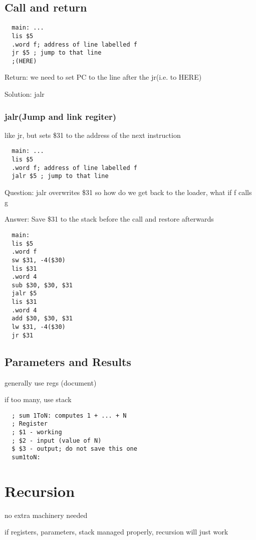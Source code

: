 \documentclass[11pt]{amsart}
\begin{document}
\subsection{Call and return}
\begin{verbatim}
  main: ...
  lis $5
  .word f; address of line labelled f
  jr $5 ; jump to that line
  ;(HERE)
\end{verbatim}
\par Return: we need to set PC to the line after the jr(i.e. to HERE)
\par Solution: jalr
\subsubsection{jalr(Jump and link regiter)}
\par like jr, but sets \$31 to the address of the next instruction
\begin{verbatim}
  main: ...
  lis $5
  .word f; address of line labelled f
  jalr $5 ; jump to that line
\end{verbatim}
\par  Question: jalr overwrites \$31 so how do we get back to the loader, what if f calls
g
\par Answer: Save \$31 to the stack before the call and restore afterwards

\begin{verbatim}
  main:
  lis $5
  .word f
  sw $31, -4($30)
  lis $31
  .word 4
  sub $30, $30, $31
  jalr $5
  lis $31
  .word 4
  add $30, $30, $31
  lw $31, -4($30)
  jr $31
\end{verbatim}

\subsection{Parameters and Results}
\par generally use regs (document)
\par if too many, use stack
\begin{verbatim}
  ; sum 1ToN: computes 1 + ... + N
  ; Register
  ; $1 - working
  ; $2 - input (value of N)
  $ $3 - output; do not save this one
  sum1toN:
\end{verbatim}
\section{Recursion}
\par no extra machinery needed
\par if registers, parameters, stack managed properly, recursion will just work
\end{document}
